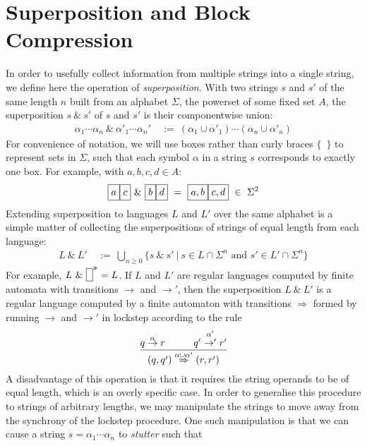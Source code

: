 \documentclass[a4paper,11pt,leqno]{article}
\makeatletter
\newcommand{\vph}[1]{\vphantom{#1}}
\newcommand{\sta}[2]{\stackrel{#1}{#2}}
\newcommand{\ebox}[1]{\fbox{$\vph{',}#1$}}
\newcommand{\eboxb}[1]{\fbox{$\vph{@}#1$}}
\makeatother
\begin{document}
\section{Superposition and Block Compression}\label{sp and bc}
In order to usefully collect information from multiple strings into a single 
string, we define here the operation of \textit{superposition}.
With two strings $s$ and $s'$ of the same length $n$
built from an alphabet $\Sigma$, the powerset of some fixed set 
$A$,
the superposition $s ~\&~ s'$ of $s$ and $s'$ is their componentwise 
union:
\begin{align}
\alpha_1\cdots\alpha_n \ \&\ 
\alpha'_1\cdots\alpha_n' & \ :=\
(\alpha_1\cup\alpha'_1)\cdots(\alpha_n\cup\alpha'_n)
\end{align}
For convenience of notation, we will use boxes rather than curly braces 
$\{$~$\}$ to represent sets in $\Sigma$, such that each symbol $\alpha$ in a 
string $s$ corresponds to exactly one box. For example, with $a, b, c, d \in 
A$:
\begin{align}
\ebox{a}\ebox{c} \ \& \ \ebox{b}\ebox{d} \ = \
\ebox{a, b}\ebox{c, d} \ \in\ \Sigma^2
\end{align}
Extending superposition to languages $L$ and $L'$ over the same alphabet is a 
simple matter of 
collecting the superpositions of strings of equal length from each language: 
\begin{align}
L ~\&~ L' & \ :=\ \bigcup_{n\geq 0}
\{s~\&~s'\ | \ s\in L\cap \Sigma^n\mbox{ and }s'\in L'\cap \Sigma^n\}
\end{align}%
For example, $L ~\&~ \eboxb{}^{\mbox{$\ast$}} = L$.
If $L$ and $L'$ are regular languages computed by finite automata
with transitions $\to$ and $\to'$, then the superposition $L~\&~ L'$ is
a regular language computed by a finite automaton with transitions
$\Rightarrow$
formed by running $\to$ and $\to'$ in lockstep
according to the rule 
\begin{align}
\frac{q \sta{\alpha}{\to} r   \hspace{.4in} q' \sta{\alpha'}{\to'} r'}{
	(q,q') \sta{\alpha\cup\alpha'}{\Rightarrow} (r,r')}
\end{align}
A disadvantage of this operation is that it requires the string operands to be 
of equal length, which is an overly specific case. In order to generalise this 
procedure to strings of arbitrary lengths, we may 
manipulate the strings to move away from the synchrony of the lockstep 
procedure. One such manipulation is that 
we can cause a string $s=\alpha_1\cdots\alpha_n$ to \textit{stutter} such that 
\end{document}
